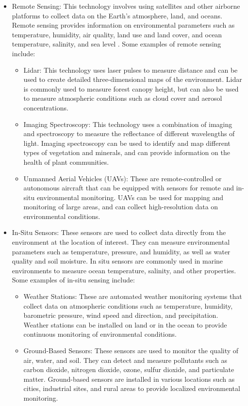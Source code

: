 \begin{itemize}
\item Remote Sensing: This technology involves using satellites and other airborne platforms to collect data on the Earth's atmosphere, land, and oceans. Remote sensing provides information on environmental parameters such as temperature, humidity, air quality, land use and land cover, and ocean temperature, salinity, and sea level \cite{Thenkabail2019, Buyantuyev2017, Gamon2016, Wang2017, Pasher2019}. Some examples of remote sensing include:
  \begin{itemize}
    \item Lidar: This technology uses laser pulses to measure distance and can be used to create detailed three-dimensional maps of the environment. Lidar is commonly used to measure forest canopy height, but can also be used to measure atmospheric conditions such as cloud cover and aerosol concentrations.
    \item Imaging Spectroscopy: This technology uses a combination of imaging and spectroscopy to measure the reflectance of different wavelengths of light. Imaging spectroscopy can be used to identify and map different types of vegetation and minerals, and can provide information on the health of plant communities.
    \item Unmanned Aerial Vehicles (UAVs): These are remote-controlled or autonomous aircraft that can be equipped with sensors for remote and in-situ  environmental monitoring. UAVs can be used for mapping and monitoring of large areas, and can collect high-resolution data on environmental conditions.
  \end{itemize}
\item In-Situ Sensors: These sensors are used to collect data directly from the environment at the location of interest. They can measure environmental parameters such as temperature, pressure, and humidity, as well as water quality and soil moisture. In situ sensors are commonly used in marine environments to measure ocean temperature, salinity, and other properties. Some examples of in-situ sensing include:
  \begin{itemize}
  \item Weather Stations: These are automated weather monitoring systems that collect data on atmospheric conditions such as temperature, humidity, barometric pressure, wind speed and direction, and precipitation. Weather stations can be installed on land or in the ocean to provide continuous monitoring of environmental conditions.
  \item Ground-Based Sensors: These sensors are used to monitor the quality of air, water, and soil. They can detect and measure pollutants such as carbon dioxide, nitrogen dioxide, ozone, sulfur dioxide, and particulate matter. Ground-based sensors are installed in various locations such as cities, industrial sites, and rural areas to provide localized environmental monitoring.

\end{itemize}
\end{itemize}
